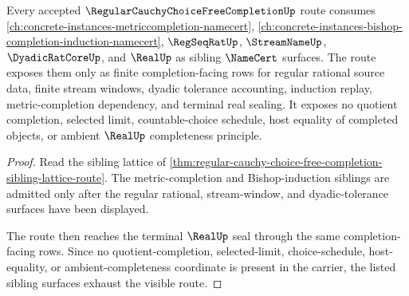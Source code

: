 \begin{theorem}
\label{thm:regular-cauchy-choice-free-completion-sibling-route}
Every accepted $\RegularCauchyChoiceFreeCompletionUp$ route consumes \autoref{ch:concrete-instances-metriccompletion-namecert}, \autoref{ch:concrete-instances-bishop-completion-induction-namecert}, $\RegSeqRatUp$, $\StreamNameUp$, $\DyadicRatCoreUp$, and $\RealUp$ as sibling $\NameCert$ surfaces. The route exposes them only as finite completion-facing rows for regular rational source data, finite stream windows, dyadic tolerance accounting, induction replay, metric-completion dependency, and terminal real sealing. It exposes no quotient completion, selected limit, countable-choice schedule, host equality of completed objects, or ambient $\RealUp$ completeness principle.
\end{theorem}
\begin{proof}
Read the sibling lattice of \autoref{thm:regular-cauchy-choice-free-completion-sibling-lattice-route}. The metric-completion and Bishop-induction siblings are admitted only after the regular rational, stream-window, and dyadic-tolerance surfaces have been displayed.

The route then reaches the terminal $\RealUp$ seal through the same completion-facing rows. Since no quotient-completion, selected-limit, choice-schedule, host-equality, or ambient-completeness coordinate is present in the carrier, the listed sibling surfaces exhaust the visible route.
\end{proof}

